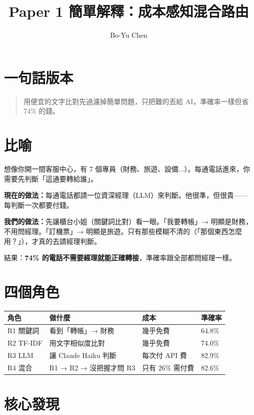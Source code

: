 \documentclass[11pt,a4paper]{article}
\title{\textbf{Paper 1 簡單解釋：成本感知混合路由}}
\author{Bo-Yu Chen}
\date{}
\begin{document}
\maketitle

\section*{一句話版本}

\begin{quote}
用便宜的文字比對先過濾掉簡單問題，只把難的丟給 AI，準確率一樣但省 74\% 的錢。
\end{quote}

\section*{比喻}

想像你開一間客服中心，有 7 個專員（財務、旅遊、設備...）。每通電話進來，你需要先判斷「這通要轉給誰」。

\textbf{現在的做法：}每通電話都請一位資深經理（LLM）來判斷。他很準，但很貴——每判斷一次都要付錢。

\textbf{我們的做法：}先讓櫃台小姐（關鍵詞比對）看一眼。「我要轉帳」→ 明顯是財務，不用問經理。「訂機票」→ 明顯是旅遊。只有那些模糊不清的（「那個東西怎麼用？」），才真的去請經理判斷。

結果：\textbf{74\% 的電話不需要經理就能正確轉接}，準確率跟全部都問經理一樣。

\section*{四個角色}

\begin{center}
\begin{tabular}{llll}
\toprule
\textbf{角色} & \textbf{做什麼} & \textbf{成本} & \textbf{準確率} \\
\midrule
R1 關鍵詞 & 看到「轉帳」→ 財務 & 幾乎免費 & 64.8\% \\
R2 TF-IDF & 用文字相似度比對 & 幾乎免費 & 74.0\% \\
R3 LLM & 讓 Claude Haiku 判斷 & 每次付 API 費 & 82.9\% \\
R4 混合 & R1 → R2 → 沒把握才問 R3 & 只有 26\% 需付費 & 82.6\% \\
\bottomrule
\end{tabular}
\end{center}

\section*{核心發現}
\end{document}
